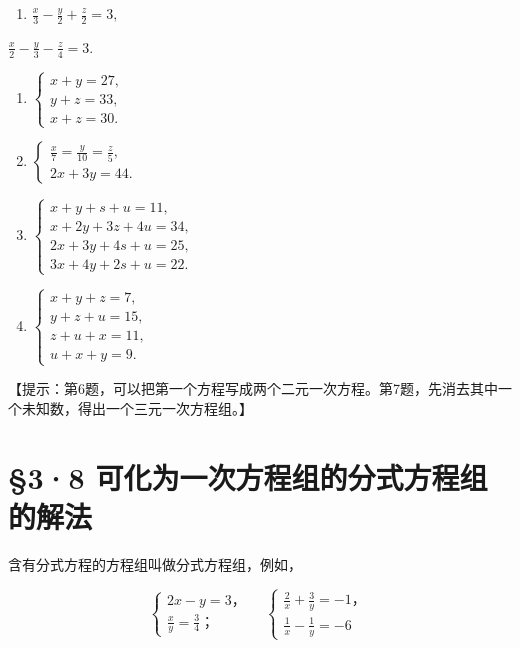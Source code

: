 \begin{enumerate}[start=3]
\item
  \(\frac{x}{3} -\frac{y}{2} +\frac{z}{2} = 3,\)
\end{enumerate}

\(\frac{x}{2} -\frac{y}{3} -\frac{z}{4} = 3.\)

\begin{enumerate}[start=5]
\item
  \(\left\{ \begin{array}{l} x + y = 27, \\ y + z = 33, \\ x + z = 30. \end{array} \right.\)
\item
  \(\left\{ \begin{array}{l} \frac{x}{7} = \frac{y}{10} = \frac{z}{5}, \\ 2x + 3y = 44. \end{array} \right.\)
\item
  \(\left\{ \begin{array}{l} x + y + s + u = 11, \\ x + 2y + 3z + 4u = 34, \\ 2x + 3y + 4s + u = 25, \\ 3x + 4y + 2s + u = 22. \end{array} \right.\)
\item
  \(\left\{ \begin{array}{l} x + y + z = 7, \\ y + z + u = 15, \\ z + u + x = 11, \\ u + x + y = 9. \end{array} \right.\)
\end{enumerate}

【提示：第6题，可以把第一个方程写成两个二元一次方程。第7题，先消去其中一个未知数，得出一个三元一次方程组。】

\section{§3·8 可化为一次方程组的分式方程组的解法}

含有分式方程的方程组叫做分式方程组，例如，

\[
\left\{ \begin{array}{l} 2 x - y = 3\text{，} \\ \frac{x}{y} = \frac{3}{4}\text{；} \end{array} \right. \quad \left\{ \begin{array}{l} \frac{2}{x} + \frac{3}{y} = - 1\text{，} \\ \frac{1}{x} - \frac{1}{y} = - 6 \end{array} \right.
\]


